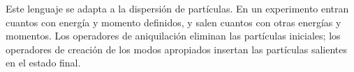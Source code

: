 Este lenguaje se adapta a la dispersión de partículas. En un experimento entran cuantos con energía y momento definidos, y salen cuantos con otras energías y momentos. Los operadores de aniquilación eliminan las partículas iniciales; los operadores de creación de los modos apropiados insertan las partículas salientes en el estado final.

\begin{classroomqa}
\end{classroomqa}